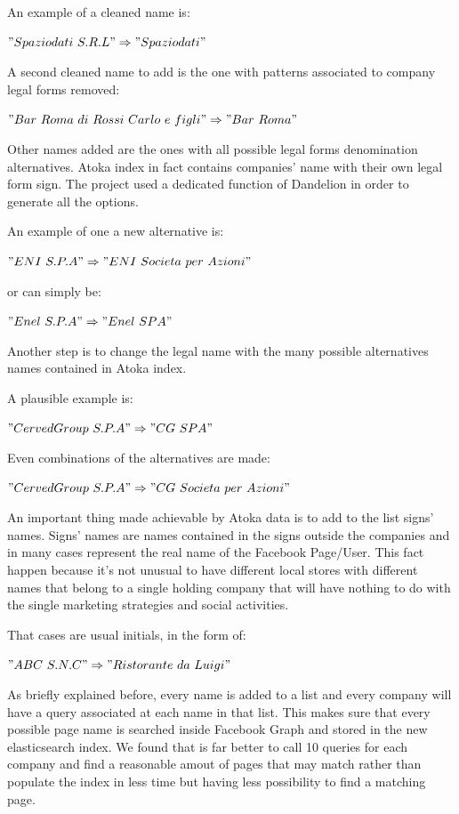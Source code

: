 An example of a cleaned name is: 

$ "Spaziodati\ S.R.L" \Rightarrow "Spaziodati" $

A second cleaned name to add is the one with patterns associated to company legal forms removed:

$ "Bar\ Roma\ di\ Rossi\ Carlo\ e\ figli" \Rightarrow "Bar\ Roma"$

Other names added are the ones with all possible legal forms denomination alternatives. Atoka index in fact contains companies' name with their own legal form sign. The project used a dedicated function of Dandelion in order to generate all the options.

An example of one a new alternative is:

$ "ENI\ S.P.A" \Rightarrow "ENI\ Societa\ per\ Azioni" $

or can simply be:

$ "Enel\ S.P.A" \Rightarrow "Enel\ SPA" $

Another step is to change the legal name with the many possible alternatives names contained in Atoka index.

A plausible example is:

$ "CervedGroup\ S.P.A" \Rightarrow "CG\ SPA" $

Even combinations of the alternatives are made:

$ "CervedGroup\ S.P.A" \Rightarrow "CG\ Societa\ per\ Azioni" $

An important thing made achievable by Atoka data is to add to the list signs' names. Signs' names are names contained in the signs outside the companies and in many cases represent the real name of the Facebook Page/User. This fact happen because it's not unusual to have different local stores with different names that belong to a single holding company that will have nothing to do with the single marketing strategies and social activities.

That cases are usual initials, in the form of:

$ "ABC\ S.N.C" \Rightarrow "Ristorante\ da\ Luigi" $

As briefly explained before, every name is added to a list and every company will have a query associated at each name in that list. This makes sure that every possible page name is searched inside Facebook Graph and stored in the new elasticsearch index. We found that is far better to call 10 queries for each company and find a reasonable amout of pages that may match rather than populate the index in less time but having less possibility to find a matching page.

